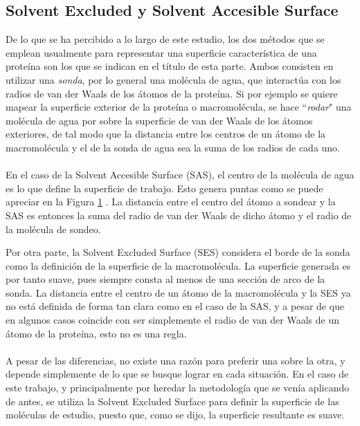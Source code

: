 \documentclass[12pt, oneside, numbers, spanish]{ezthesis}
\numberwithin{equation}{section}
\begin{document}
\subsection{Solvent Excluded y Solvent Accesible Surface}\label{subsec:SES_SAS}
De lo que se ha percibido a lo largo de este estudio, los dos métodos que se emplean usualmente para representar una superficie característica de una proteína son los que se indican en el título de esta parte. Ambos consisten en utilizar una \textit{sonda}, por lo general una molécula de agua, que interactúa con los radios de van der Waals de los átomos de la proteína. Si por ejemplo se quiere mapear la superficie exterior de la proteína o macromolécula, se hace ``\textit{rodar}" una molécula de agua por sobre la superficie de van der Waals de los átomos exteriores, de tal modo que la distancia entre los centros de un átomo de la macromolécula y el de la sonda de agua sea la suma de los radios de cada uno.\\\\
En el caso de la Solvent Accesible Surface (SAS), el centro de la molécula de agua es lo que define la superficie de trabajo. Esto genera puntas como se puede apreciar en la Figura \ref{Fig:SAS_and_SES} . La distancia entre el centro del átomo a sondear y la SAS es entonces la suma del radio de van der Waals de dicho átomo y el radio de la molécula de sondeo.
\begin{figure}[H]
	\centering
	
	\caption{}\label{Fig:SAS_and_SES}
\end{figure}
\noindent
Por otra parte, la Solvent Excluded Surface (SES) considera el borde de la sonda como la definición de la superficie de la macromolécula. La superficie generada es por tanto suave, pues siempre consta al menos de una sección de arco de la sonda. La distancia entre el centro de un átomo de la macromolécula y la SES ya no está definida de forma tan clara como en el caso de la SAS, y a pesar de que en algunos casos coincide con ser simplemente el radio de van der Waals de un átomo de la proteína, esto no es una regla.\\\\
A pesar de las diferencias, no existe una razón para preferir una sobre la otra, y depende simplemente de lo que se busque lograr en cada situación. En el caso de este trabajo, y principalmente por heredar la metodología que se venía aplicando de antes, se utiliza la Solvent Excluded Surface para definir la superficie de las moléculas de estudio, puesto que, como se dijo, la superficie resultante es suave.
\end{document}
